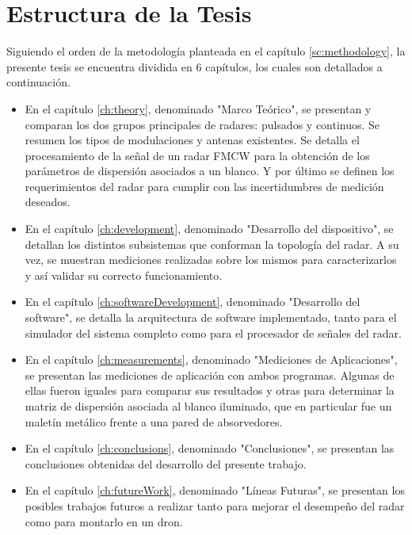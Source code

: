 \section{Estructura de la Tesis} \label{sc:structure}

Siguiendo el orden de la metodología planteada en el capítulo \ref{sc:methodology}, la presente tesis se encuentra dividida en 6 capítulos, los cuales son detallados a continuación.

\begin{itemize}
    \item En el capítulo \ref{ch:theory}, denominado "Marco Teórico", se presentan y comparan los dos grupos principales de radares: pulsados y continuos. Se resumen los tipos de modulaciones y antenas existentes. Se detalla el procesamiento de la señal de un radar FMCW para la obtención de los parámetros de dispersión asociados a un blanco. Y por último se definen los requerimientos del radar para cumplir con las incertidumbres de medición deseados.

    \item En el capítulo \ref{ch:development}, denominado "Desarrollo del dispositivo", se detallan los distintos subsistemas que conforman la topología del radar. A su vez, se muestran mediciones realizadas sobre los mismos para caracterizarlos y así validar su correcto funcionamiento.

    \item En el capítulo \ref{ch:softwareDevelopment}, denominado "Desarrollo del software", se detalla la arquitectura de software implementado, tanto para el simulador del sistema completo como para el procesador de señales del radar.

    \item En el capítulo \ref{ch:measurements}, denominado "Mediciones de Aplicaciones", se presentan las mediciones de aplicación con ambos programas. Algunas de ellas fueron iguales para comparar sus resultados y otras para determinar la matriz de dispersión asociada al blanco iluminado, que en particular fue un maletín metálico frente a una pared de absorvedores.

    \item En el capítulo \ref{ch:conclusions}, denominado "Conclusiones", se presentan las conclusiones obtenidas del desarrollo del presente trabajo.

    \item En el capítulo \ref{ch:futureWork}, denominado "Líneas Futuras", se presentan los posibles trabajos futuros a realizar tanto para mejorar el desempeño del radar como para montarlo en un dron.
\end{itemize}